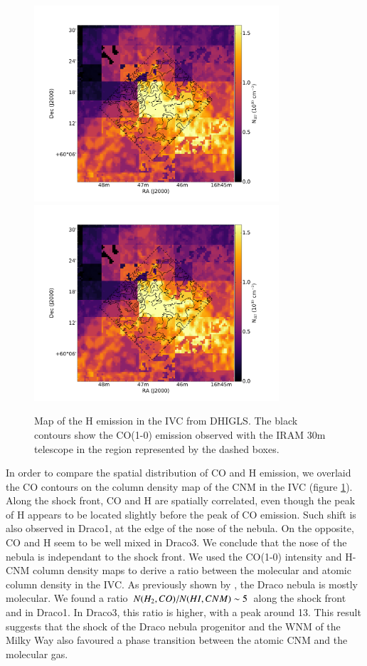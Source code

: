\documentclass[traditabstract]{aa}
\begin{document}
\begin{figure}[h!]
  \includegraphics[page=5,width=9.1cm,trim=65 30 125 75,clip=true]{Figures/HI-CO.pdf}
  \includegraphics[page=6,width=9.1cm,trim=65 30 125 75,clip=true]{Figures/HI-CO.pdf}
  \caption{\label{DRAO-CO} Map of the H emission in the IVC from DHIGLS. The black contours show the CO(1-0) emission observed with the IRAM 30m telescope in the region represented by the dashed boxes.}
\end{figure}

   In order to compare the spatial distribution of CO and H emission, we overlaid the CO contours on the column density map of the CNM in the IVC (figure \ref{DRAO-CO}). Along the shock front, CO and H are spatially correlated, even though the peak of H appears to be located slightly before the peak of CO emission.
Such shift is also observed in Draco1, at the edge of the nose of the nebula. On the opposite, CO and H seem to be well mixed in Draco3. We conclude that the nose of the nebula is independant to the shock front.
We used the CO(1-0) intensity and H-CNM column density maps to derive a ratio between the molecular and atomic column density in the IVC. As previously shown by \cite{Planck_XXIV_2011,MAMD_2017bx}, the Draco nebula is mostly molecular. We found a ratio $N(H_2,CO)/N(H\rmnum{1},CNM)\sim 5$ along the shock front and in Draco1. In Draco3, this ratio is higher, with a peak around 13. This result suggests that the shock of the Draco nebula progenitor and the WNM of the Milky Way also favoured a phase transition between the atomic CNM and the molecular gas.
\end{document}
